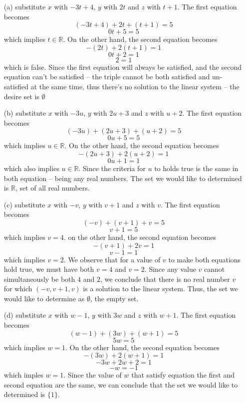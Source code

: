 \documentclass{article}
\theoremstyle{remark}
\begin{document}
\begin{enumerate}
    \item[(a)] substitute $x$ with $-3t + 4$, $y$ with $2t$ and $z$ with $t + 1$. The first equation becomes
    \[(-3t + 4) + 2t + (t + 1) = 5\]
    \[0t + 5 = 5\]
    which implies $t \in \mathbb{R}$. On the other hand, the second equation becomes
    \[-(2t) + 2(t + 1) = 1\]
    \[0t + 2 = 1\]
    \[2 = 1\]
    which is false. Since the first equation will always be satisfied, and the second equation can't be satisfied -- the triple cannot be both satisfied and un-satisfied at the same time, thus there's no solution to the linear system -- the desire set is $\emptyset$

    \item[(b)] substitute $x$ with $-3u$, $y$ with $2u + 3$ and $z$ with $u + 2$. The first equation becomes 
    \[(-3u) + (2u + 3) + (u + 2) = 5\] 
    \[0u + 5 = 5\] 
    which implies $u \in \mathbb{R}$. 
    On the other hand, the second equation becomes 
    \[-(2u + 3) + 2(u + 2) = 1\] 
    \[0u + 1 = 1\] 
    which also implies $u \in \mathbb{R}$. Since the criteria for $u$ to holds true is the same in both equation -- being any real numbers. The set we would like to determined is $\mathbb{R}$, set of all real numbers.

    \item[(c)] substitute $x$ with $-v$, $y$ with $v + 1$ and $z$ with $v$. The first equation becomes 
    \[(-v) + (v + 1) + v = 5\] 
    \[v + 1 = 5\] 
    which implies $v = 4$. on the other hand, the second equation becomes 
    \[-(v + 1) + 2v = 1\] 
    \[v - 1 = 1\] 
    which implies $v = 2$. We observe that for a value of $v$ to make both equations hold true, we must have both $v = 4$ and $v = 2$. Since any value $v$ cannot simultaneously be both $4$ and $2$, we conclude that there is no real number $v$ for which $(-v, v + 1, v)$ is a solution to the linear system. Thus, the set we would like to determine as $\emptyset$, the empty set.   

    \item[(d)] substitute $x$ with $w - 1$, $y$ with $3w$ and $z$ with $w + 1$. The first equation becomes 
    \[(w - 1) + (3w) + (w + 1) = 5\] 
    \[5w = 5\] 
    which implies $w = 1$. On the other hand, the second equation becomes 
    \[-(3w) + 2(w + 1) = 1\] 
    \[-3w + 2w + 2 = 1\]   
    \[-w = -1\]
    which imples $w = 1$. Since the value of $w$ that satisfy equation the first and second equation are the same, we can conclude that the set we would like to determined is $\{1\}$. 
\end{enumerate}
\end{document}
